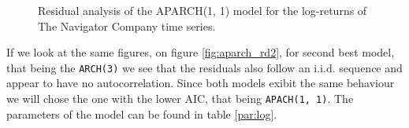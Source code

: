 \documentclass{article}
\begin{document}
\begin{figure}[ht!]
   \centering

   \caption{Residual analysis of the APARCH(1, 1)
    model for the log-returns of The Navigator Company time series.}
    \label{fig:aparch_rd}
\end{figure}

If we look at the same figures, on figure \ref{fig:aparch_rd2}, for second best model, that being the \verb|ARCH(3)| we see that the residuals also follow an i.i.d. sequence and appear to have no autocorrelation. Since both models exibit the same behaviour we will chose the one with the lower AIC, that being \verb|APACH(1, 1)|. The parameters of the model can be found in  table
\ref{par:log}.
\end{document}
